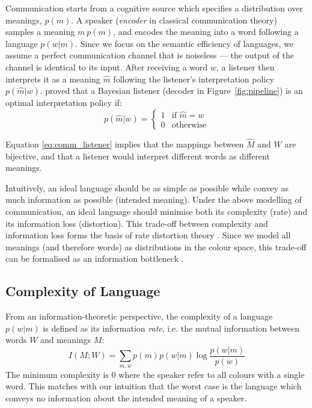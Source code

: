 \documentclass[11pt]{article}
\begin{document}
Communication starts from a cognitive source which specifies a distribution over meanings, $p(m)$. 
A speaker (\textit{encoder} in classical communication theory) samples a meaning $m~p(m)$, and encodes the meaning into a word following a language $p(w|m)$.
Since we focus on the semantic efficiency of languages, we assume a perfect communication channel that is noiseless --- the output of the channel is identical to its input.
After receiving a word $w$, a listener then interprets it as a meaning $\hat{m}$ following the listener's interpretation policy $p(\hat{m}|w)$.
\citet{zaslavsky2018efficient} proved that a Bayesian listener (decoder in Figure~\ref{fig:pipeline}) is an optimal interpretation policy if:
\begin{equation}
        p(\hat{m}|w) =
        \begin{cases}
            1 & \text{if $\hat{m}=w$}\\
            0 & \text{otherwise}
        \end{cases} 
        \label{eq:comm_listener}
    \end{equation}

Equation \ref{eq:comm_listener} implies that the mappings between $\hat{M}$ and $W$ are bijective, and that a listener would interpret different words as different meanings. %

Intuitively, an ideal language should be as simple as possible while convey as much information as possible (intended meaning).
Under the above modelling of communication, an ideal language should minimise both its complexity (rate) and its information loss (distortion).
This trade-off between complexity and information loss forms the basis of rate distortion theory \citep[RDT,][]{shannon1959coding}.
Since we model all meanings (and therefore words) as distributions in the colour space, this trade-off can be formalised as an information bottleneck \citep[IB,][]{tishby2000information}.

\subsection{Complexity of Language}
From an information-theoretic perspective, the complexity of a language $p(w|m)$ is defined as its information \emph{rate}, i.e. the mutual information between words $W$ and meanings $M$:
\begin{equation}
    I(M;W) = \sum_{m,w} p(m)p(w|m)\log \frac{p(w|m)}{p(w)}
    \label{eq:comm_complexity_definition}
\end{equation}
The minimum complexity is $0$ where the speaker refer to all colours with a single word. 
This matches with our intuition that the worst case is the language which conveys no information about the intended meaning of a speaker.
\end{document}
